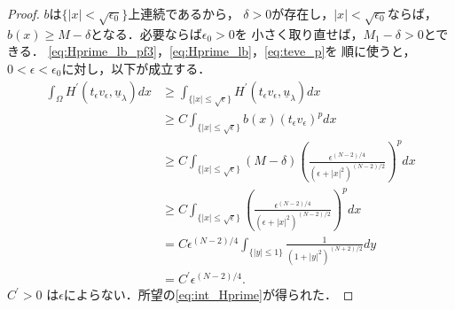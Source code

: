 \begin{proof}
 $b$は$\{ \lvert x \rvert < \sqrt{\epsilon_0}\}$上連続であるから，
 $\delta > 0$が存在し，$\lvert x \rvert < \sqrt{\epsilon_0}$ならば，
 $b(x) \geq M - \delta$となる．必要ならば$\epsilon_0 > 0$を
 小さく取り直せば，$M_1 - \delta > 0$とできる．
 \eqref{eq:Hprime_lb_pf3}，\eqref{eq:Hprime_lb}，\eqref{eq:teve_p}を
 順に使うと，
 $0 < \epsilon < \epsilon_0$に対し，以下が成立する．
 \begin{align*}
  \int_\Omega H^\prime(t_\epsilon v_\epsilon, \underline{u}_\lambda )
  dx & \geq \int_{\{ \lvert x \rvert \leq \sqrt{\epsilon} \}} 
  H^\prime(t_\epsilon v_\epsilon, \underline{u}_\lambda ) dx \\
  & \geq C \int_{\{ \lvert x \rvert \leq \sqrt{\epsilon} \}} 
  b(x) (t_\epsilon v_\epsilon)^p dx \\
  & \geq C \int_{\{ \lvert x \rvert \leq \sqrt{\epsilon} \}} 
  (M - \delta) \left(
  \frac{\epsilon^{(N-2)/4}}{(\epsilon + \lvert x \rvert^2)^{(N-2)/2}}
  \right)^p dx \\
  & \geq C \int_{\{ \lvert x \rvert \leq \sqrt{\epsilon} \}} 
  \left(
  \frac{\epsilon^{(N-2)/4}}{(\epsilon + \lvert x \rvert^2)^{(N-2)/2}}
  \right)^p dx \\
  & = C \epsilon^{(N-2)/4} \int_{ \{ \lvert y \rvert \leq 1 \}}
  \frac{1}{(1 + \lvert y \rvert^2)^{(N+2)/2}} dy \\
  & = C^\prime \epsilon^{(N-2)/4}.
 \end{align*}
 $C^\prime > 0$
 は$\epsilon$によらない．所望の\eqref{eq:int_Hprime}が得られた．\qedhere
\end{proof}

